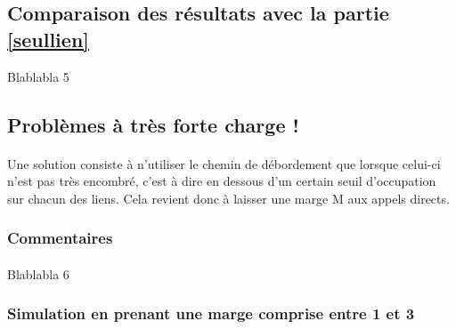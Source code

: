         \subsection{Comparaison des résultats avec la partie \ref{seullien}}
Blablabla 5

%
%
    \clearpage
%
%
        \subsection{Problèmes à très forte charge !}
%
            \paragraph{}
Une solution consiste à n'utiliser le chemin de débordement que lorsque celui-ci n'est pas très encombré, c'est à dire en dessous d'un certain seuil d'occupation sur chacun des liens.
Cela revient donc à laisser une marge M aux appels directs.
%
%
            \subsubsection{Commentaires}
%
                \paragraph{}
Blablabla 6
%
%
            \subsubsection{Simulation en prenant une marge comprise entre 1 et 3}
%
